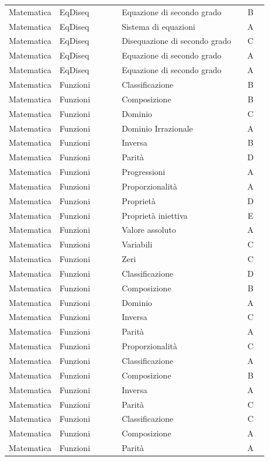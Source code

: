 \documentclass[20pt, a4paper]{article}
\begin{document}
\begin{longtable}{@{}>{\raggedright\arraybackslash}p{0.18\linewidth}>{\raggedright\arraybackslash}p{0.24\linewidth}>{\raggedright\arraybackslash}p{0.46\linewidth}c@{}}
Matematica & EqDiseq & Equazione di secondo grado & B \\
Matematica & EqDiseq & Sistema di equazioni & A \\
Matematica & EqDiseq & Disequazione di secondo grado & C \\
Matematica & EqDiseq & Equazione di secondo grado & A \\
Matematica & EqDiseq & Equazione di secondo grado & A \\
Matematica & Funzioni & Classificazione & B \\
Matematica & Funzioni & Composizione & B \\
Matematica & Funzioni & Dominio & C \\
Matematica & Funzioni & Dominio Irrazionale & A \\
Matematica & Funzioni & Inversa & B \\
Matematica & Funzioni & Parità & D \\
Matematica & Funzioni & Progressioni & A \\
Matematica & Funzioni & Proporzionalità & A \\
Matematica & Funzioni & Proprietà & D \\
Matematica & Funzioni & Proprietà iniettiva & E \\
Matematica & Funzioni & Valore assoluto & A \\
Matematica & Funzioni & Variabili & C \\
Matematica & Funzioni & Zeri & C \\
Matematica & Funzioni & Classificazione & D \\
Matematica & Funzioni & Composizione & B \\
Matematica & Funzioni & Dominio & A \\
Matematica & Funzioni & Inversa & C \\
Matematica & Funzioni & Parità & A \\
Matematica & Funzioni & Proporzionalità & C \\
Matematica & Funzioni & Classificazione & A \\
Matematica & Funzioni & Composizione & B \\
Matematica & Funzioni & Inversa & A \\
Matematica & Funzioni & Parità & C \\
Matematica & Funzioni & Classificazione & C \\
Matematica & Funzioni & Composizione & A \\
Matematica & Funzioni & Parità & A \\

\end{longtable}
\end{document}
